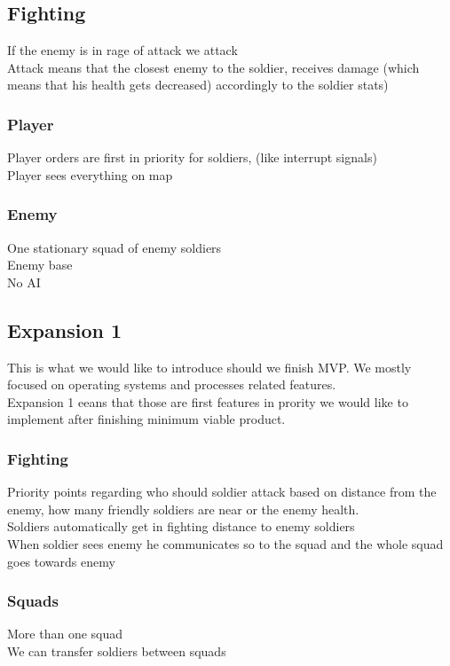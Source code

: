 \documentclass{article}
\begin{document}
\subsection{Fighting}
If the enemy is in rage of attack we attack \\
Attack means that the closest enemy to the soldier, receives damage (which means that his health gets decreased) accordingly to the soldier stats)

\subsubsection{Player}
Player orders are first in priority for soldiers, (like interrupt signals) \\ 
Player sees everything on map

\subsubsection{Enemy}
One stationary squad of enemy soldiers \\ 
Enemy base \\ 
No AI \\

\subsection{Expansion 1}
This is what we would like to introduce should we finish MVP. We mostly focused
on operating systems and processes related features. \\
Expansion 1 eeans that those are first features in prority we would like to
implement after finishing minimum viable product. 
\subsubsection{Fighting}
Priority points regarding who should soldier attack based on distance from the
enemy, how many friendly soldiers are near or the enemy health. \\ 
Soldiers automatically get in fighting distance to enemy soldiers \\ 
When soldier sees enemy he communicates so to the squad and the whole squad goes towards enemy

\subsubsection{Squads}
More than one squad \\ 
We can transfer soldiers between squads 
\end{document}
